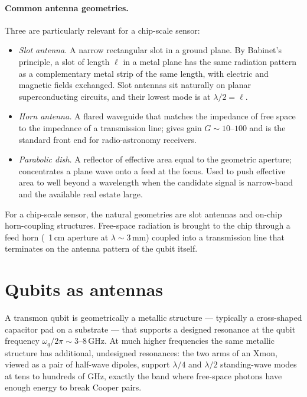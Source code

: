\paragraph{Common antenna geometries.}
Three are particularly relevant for a chip-scale sensor:
\begin{itemize}
  \item \emph{Slot antenna.} A narrow rectangular slot in a
        ground plane. By Babinet's principle, a slot of length
        $\ell$ in a metal plane has the same radiation pattern as
        a complementary metal strip of the same length, with
        electric and magnetic fields exchanged.  Slot antennas
        sit naturally on planar superconducting circuits, and
        their lowest mode is at $\lambda/2 = \ell$.
  \item \emph{Horn antenna.} A flared waveguide that matches the
        impedance of free space to the impedance of a transmission
        line; gives gain $G\sim 10$--$100$ and is the standard
        front end for radio-astronomy receivers.
  \item \emph{Parabolic dish.} A reflector of effective area
        equal to the geometric aperture; concentrates a plane wave
        onto a feed at the focus. Used to push effective area to
        well beyond a wavelength when the candidate signal is
        narrow-band and the available real estate large.
\end{itemize}
For a chip-scale sensor, the natural geometries are slot antennas
and on-chip horn-coupling structures. Free-space radiation is
brought to the chip through a feed horn (~1\,cm aperture at
$\lambda\sim 3\,\text{mm}$) coupled into a transmission line that
terminates on the antenna pattern of the qubit itself.

\section{Qubits as antennas}
\label{sec:qubit-as-antenna}

\begin{phenomenon}
A transmon qubit is geometrically a metallic structure --- typically
a cross-shaped capacitor pad on a substrate --- that supports a
designed resonance at the qubit frequency $\omega_q/2\pi\sim
3$--$8\,\text{GHz}$.  At much higher frequencies the same
metallic structure has additional, undesigned resonances: the
two arms of an Xmon, viewed as a pair of half-wave dipoles,
support $\lambda/4$ and $\lambda/2$ standing-wave modes at tens
to hundreds of GHz, exactly the band where free-space photons
have enough energy to break Cooper pairs.
\end{phenomenon}

